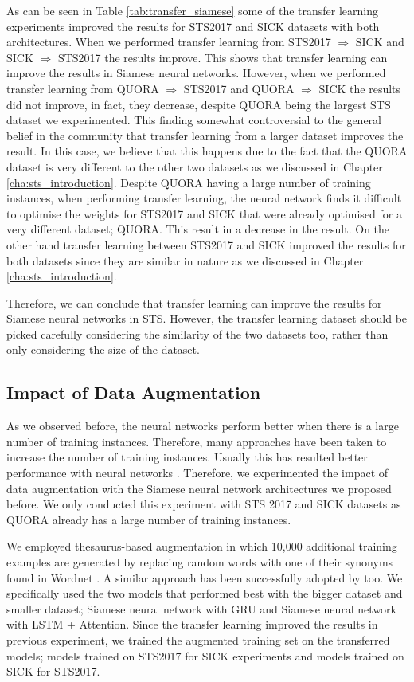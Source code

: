As can be seen in Table \ref{tab:transfer_siamese} some of the transfer learning experiments improved the results for STS2017 and SICK datasets with both architectures. When we performed transfer learning from STS2017 $\Rightarrow$ SICK and SICK $\Rightarrow$ STS2017 the results improve. This shows that transfer learning can improve the results in Siamese neural networks. However, when we performed transfer learning from QUORA $\Rightarrow$ STS2017 and QUORA $\Rightarrow$ SICK the results did not improve, in fact, they decrease, despite QUORA being the largest STS dataset we experimented. This finding somewhat controversial to the general belief in the community that transfer learning from a larger dataset improves the result. In this case, we believe that this happens due to the fact that the QUORA dataset is very different to the other two datasets as we discussed in Chapter \ref{cha:sts_introduction}. Despite QUORA having a large number of training instances, when performing transfer learning, the neural network finds it difficult to optimise the weights for STS2017 and SICK that were already optimised for a very different dataset; QUORA. This result in a decrease in the result. On the other hand transfer learning between STS2017 and SICK improved the results for both datasets since they are similar in nature as we discussed in Chapter \ref{cha:sts_introduction}. 

Therefore, we can conclude that transfer learning can improve the results for Siamese neural networks in STS. However, the transfer learning dataset should be picked carefully considering the similarity of the two datasets too, rather than only considering the size of the dataset.


\subsection{Impact of Data Augmentation}
\label{sec:siamese_aug}
As we observed before, the neural networks perform better when there is a large number of training instances. Therefore, many approaches have been taken to increase the number of training instances. Usually this has resulted better performance with neural networks \cite{wei-zou-2019-eda}. Therefore, we experimented the impact of data augmentation with the Siamese neural network architectures we proposed before. We only conducted this experiment with STS 2017 and SICK datasets as QUORA already has a large number of training instances.

We employed thesaurus-based augmentation in which 10,000 additional training examples are generated by replacing random words with one of their synonyms found in Wordnet \cite{10.1145/219717.219748}. A similar approach has been successfully adopted by \citet{Mueller_Thyagarajan_2016, 10.5555/2969239.2969312} too.  We specifically used the two models that performed best with the bigger dataset and smaller dataset; Siamese neural network with GRU and Siamese neural network with LSTM + Attention. Since the transfer learning improved the results in previous experiment, we trained the augmented training set on the transferred models; models trained on STS2017 for SICK experiments and models trained on SICK for STS2017. 


